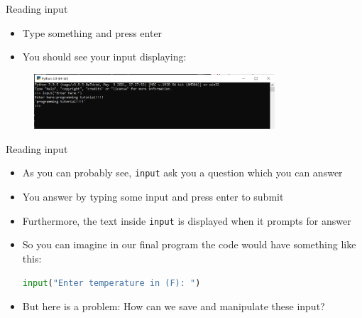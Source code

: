\documentclass[10pt,xcolor={table,dvipsnames},t]{beamer}
\begin{document}
\begin{frame}{Reading input}
  \begin{itemize}
    \item Type something and press enter 
    \item You should see your input displaying:
  \end{itemize}
  \begin{figure}
    \centering 
    \includegraphics[width=0.8\textwidth]{img/repl-input-done.PNG}
  \end{figure}
\end{frame}

\begin{frame}[fragile]{Reading input}
  \begin{itemize}
    \item As you can probably see, \texttt{input} ask you a question which you can answer 
    \item You answer by typing some input and press enter to submit
    \item Furthermore, the text inside \texttt{input} is displayed when it prompts for answer
    \item So you can imagine in our final program the code would have something like this:
    \begin{lstlisting}[language=python]
      input("Enter temperature in (F): ")
\end{lstlisting}
    \item But here is a problem: How can we save and manipulate these input?
  \end{itemize}
\end{frame}
\end{document}
